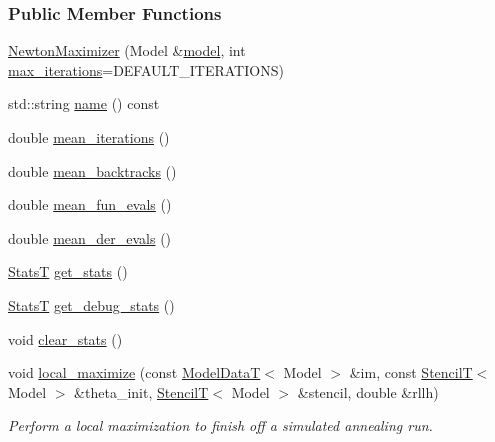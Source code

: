 \subsubsection*{Public Member Functions}
\begin{DoxyCompactItemize}
\item 
\hyperlink{classmappel_1_1NewtonMaximizer_a3e1d66615eac3a057fa5a1f6b1af6323}{Newton\+Maximizer} (Model \&\hyperlink{classmappel_1_1Estimator_a8322546d87ccdf01f8b0dcd9dae509f0}{model}, int \hyperlink{classmappel_1_1IterativeMaximizer_ac888935f332b069836a559f44cd267c7}{max\+\_\+iterations}=D\+E\+F\+A\+U\+L\+T\+\_\+\+I\+T\+E\+R\+A\+T\+I\+O\+NS)
\item 
std\+::string \hyperlink{classmappel_1_1NewtonMaximizer_aa3383487285e0268946005ddc14a0358}{name} () const 
\item 
double \hyperlink{classmappel_1_1IterativeMaximizer_ae280c757d1b614dafe87200c7ed8681a}{mean\+\_\+iterations} ()
\item 
double \hyperlink{classmappel_1_1IterativeMaximizer_aac69dd736d791e2ee10cc0fa40454ee5}{mean\+\_\+backtracks} ()
\item 
double \hyperlink{classmappel_1_1IterativeMaximizer_ad66c3997d62ee2261637482f68906ef9}{mean\+\_\+fun\+\_\+evals} ()
\item 
double \hyperlink{classmappel_1_1IterativeMaximizer_ac852178ec09b7253b5b63f5300bf77a2}{mean\+\_\+der\+\_\+evals} ()
\item 
\hyperlink{namespacemappel_a04ab395b0cf82c4ce68a36b2212649a5}{StatsT} \hyperlink{classmappel_1_1IterativeMaximizer_a22783dc49fb4fd6e754b0d0ee161c543}{get\+\_\+stats} ()
\item 
\hyperlink{namespacemappel_a04ab395b0cf82c4ce68a36b2212649a5}{StatsT} \hyperlink{classmappel_1_1IterativeMaximizer_a1d9c29b69f468200a90bcd68adfb5643}{get\+\_\+debug\+\_\+stats} ()
\item 
void \hyperlink{classmappel_1_1IterativeMaximizer_af709331a98863a0d8a4003047f2b70a2}{clear\+\_\+stats} ()
\item 
void \hyperlink{classmappel_1_1IterativeMaximizer_a452cb0415d5b30de4176fcb63bf4c58b}{local\+\_\+maximize} (const \hyperlink{namespacemappel_a97f050df953605381ae9c901c3b125f1}{Model\+DataT}$<$ Model $>$ \&im, const \hyperlink{namespacemappel_a3a06598240007876f8c4bf834ad86197}{StencilT}$<$ Model $>$ \&theta\+\_\+init, \hyperlink{namespacemappel_a3a06598240007876f8c4bf834ad86197}{StencilT}$<$ Model $>$ \&stencil, double \&rllh)
\begin{DoxyCompactList}\small\item\em Perform a local maximization to finish off a simulated annealing run. \end{DoxyCompactList}\item 

\end{DoxyCompactItemize}
